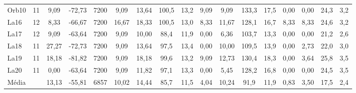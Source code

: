 \begin{landscape}
\begin{table}[H]
\begin{tabular}{ll|ccc|cccc|cccc|cccc}
Orb10                      & 11                     & 9,09   & -72,73  & 7200    & 9,09   & 13,64  & 100,5 & 13,2  & 9,09   & 9,09   & 133,3  & 17,5  & 0,00          & 0,00          & 24,3        & 3,2         \\
La16                       & 12                     & 8,33   & -66,67  & 7200    & 16,67  & 18,33  & 100,5 & 13,0  & 8,33   & 11,67  & 128,1  & 16,7  & 8,33          & 8,33          & 24,6        & 3,2         \\
La17                       & 12                     & 9,09   & -63,64  & 7200    & 9,09   & 10,00  & 88,4  & 11,9  & 0,00   & 6,36   & 103,7  & 13,3  & 0,00          & 0,00          & 21,2        & 2,6         \\
La18                       & 11                     & 27,27  & -72,73  & 7200    & 9,09   & 13,64  & 97,5  & 13,4  & 0,00   & 10,00  & 109,5  & 13,9  & 0,00          & 2,73          & 22,0        & 3,0         \\
La19                       & 11                     & 18,18  & -81,82  & 7200    & 9,09   & 18,18  & 99,6  & 13,2  & 9,09   & 12,73  & 130,4  & 18,3  & 0,00          & 3,64          & 25,8        & 3,5         \\
La20                       & 11                     & 0,00   & -63,64  & 7200    & 9,09   & 11,82  & 97,1  & 13,3  & 0,00   & 5,45   & 128,2  & 16,8  & 0,00          & 0,00          & 24,5        & 3,5         \\ \hline
Média                      &                        & 13,13  & -55,81  & 6857    & 10,02  & 14,44  & 85,7  & 11,5  & 4,04   & 10,24  & 91,9   & 11,9  & 0,83          & 3,50          & 17,5        & 2,4        
\end{tabular}
\end{table}
\end{landscape}

